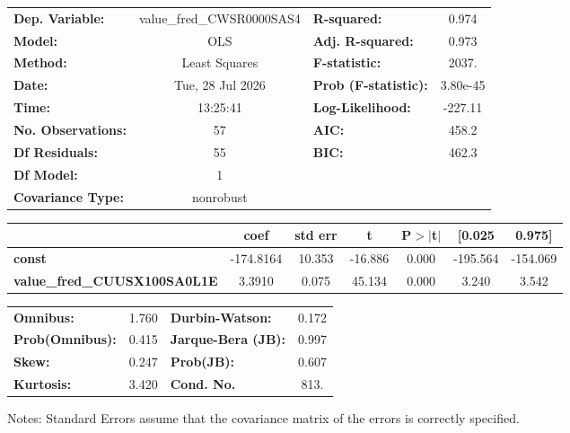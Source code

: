 \begin{center}
\begin{tabular}{lclc}
\toprule
\textbf{Dep. Variable:}              & value\_fred\_CWSR0000SAS4 & \textbf{  R-squared:         } &     0.974   \\
\textbf{Model:}                      &            OLS            & \textbf{  Adj. R-squared:    } &     0.973   \\
\textbf{Method:}                     &       Least Squares       & \textbf{  F-statistic:       } &     2037.   \\
\textbf{Date:}                       &      Tue, 28 Jul 2026     & \textbf{  Prob (F-statistic):} &  3.80e-45   \\
\textbf{Time:}                       &          13:25:41         & \textbf{  Log-Likelihood:    } &   -227.11   \\
\textbf{No. Observations:}           &               57          & \textbf{  AIC:               } &     458.2   \\
\textbf{Df Residuals:}               &               55          & \textbf{  BIC:               } &     462.3   \\
\textbf{Df Model:}                   &                1          & \textbf{                     } &             \\
\textbf{Covariance Type:}            &         nonrobust         & \textbf{                     } &             \\
\bottomrule
\end{tabular}
\begin{tabular}{lcccccc}
                                     & \textbf{coef} & \textbf{std err} & \textbf{t} & \textbf{P$> |$t$|$} & \textbf{[0.025} & \textbf{0.975]}  \\
\midrule
\textbf{const}                       &    -174.8164  &       10.353     &   -16.886  &         0.000        &     -195.564    &     -154.069     \\
\textbf{value\_fred\_CUUSX100SA0L1E} &       3.3910  &        0.075     &    45.134  &         0.000        &        3.240    &        3.542     \\
\bottomrule
\end{tabular}
\begin{tabular}{lclc}
\textbf{Omnibus:}       &  1.760 & \textbf{  Durbin-Watson:     } &    0.172  \\
\textbf{Prob(Omnibus):} &  0.415 & \textbf{  Jarque-Bera (JB):  } &    0.997  \\
\textbf{Skew:}          &  0.247 & \textbf{  Prob(JB):          } &    0.607  \\
\textbf{Kurtosis:}      &  3.420 & \textbf{  Cond. No.          } &     813.  \\
\bottomrule
\end{tabular}
\end{center}

Notes: \newline
 [1] Standard Errors assume that the covariance matrix of the errors is correctly specified.